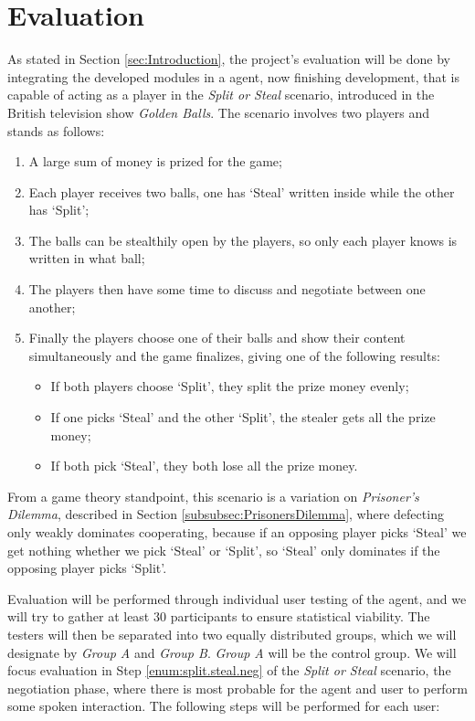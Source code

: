 \section{Evaluation}
\label{sec:Evaluation}
As stated in Section \ref{sec:Introduction}, the project's evaluation will be done by integrating the developed modules in a agent, now finishing development, that is capable of acting as a player in the \textit{Split or Steal} scenario, introduced in the British television show \textit{Golden Balls}\cite{Wikipedia.Golden.Balls}. The scenario involves two players and stands as follows:
\begin{enumerate}
	\item A large sum of money is prized for the game;
	\item Each player receives two balls, one has `Steal' written inside while the other has `Split';
	\item The balls can be stealthily open by the players, so only each player knows is written in what ball;
	\item \label{enum:split.steal.neg}The players then have some time to discuss and negotiate between one another;
	\item Finally the players choose one of their balls and show their content simultaneously and the game finalizes, giving one of the following results:
	\begin{itemize}
		\item If both players choose `Split', they split the prize money evenly;
		\item If one picks `Steal' and the other `Split', the stealer gets all the prize money;
		\item If both pick `Steal', they both lose all the prize money.
	\end{itemize}	
\end{enumerate}

From a game theory standpoint, this scenario is a variation on \textit{Prisoner's Dilemma}, described in Section \ref{subsubsec:PrisonersDilemma}, where defecting only weakly dominates cooperating, because if an opposing player picks `Steal' we get nothing whether we pick `Steal' or `Split', so `Steal' only dominates if the opposing player picks `Split'.

Evaluation will be performed through individual user testing of the agent, and we will try to gather at least 30 participants to ensure statistical viability. The testers will then be separated into two equally distributed groups, which we will designate by \textit{Group A} and \textit{Group B}. \textit{Group A} will be the control group. We will focus evaluation in Step \ref{enum:split.steal.neg} of the \textit{Split or Steal} scenario, the negotiation phase, where there is most probable for the agent and user to perform some spoken interaction. The following steps will be performed for each user:

